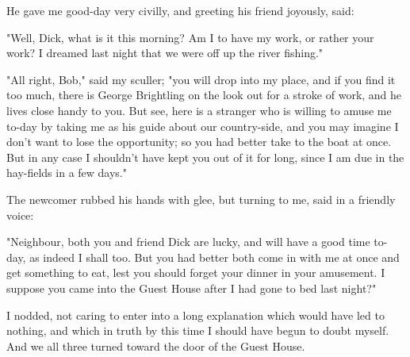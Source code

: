 He gave me good-day very civilly, and greeting his friend joyously,
said:

"Well, Dick, what is it this morning? Am I to have my work, or rather
your work? I dreamed last night that we were off up the river fishing."

"All right, Bob," said my sculler; "you will drop into my place, and if
you find it too much, there is George Brightling on the look out for a
stroke of work, and he lives close handy to you. But see, here is a
stranger who is willing to amuse me to-day by taking me as his guide
about our country-side, and you may imagine I don't want to lose the
opportunity; so you had better take to the boat at once. But in any case
I shouldn't have kept you out of it for long, since I am due in the
hay-fields in a few days."

The newcomer rubbed his hands with glee, but turning to me, said in a
friendly voice:

"Neighbour, both you and friend Dick are lucky, and will have a good
time to-day, as indeed I shall too. But you had better both come in with
me at once and get something to eat, lest you should forget your dinner
in your amusement. I suppose you came into the Guest House after I had
gone to bed last night?"

I nodded, not caring to enter into a long explanation which would have
led to nothing, and which in truth by this time I should have begun to
doubt myself. And we all three turned toward the door of the Guest
House.
